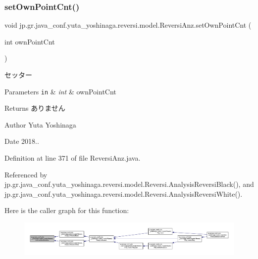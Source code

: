 \subsubsection{\texorpdfstring{set\+Own\+Point\+Cnt()}{setOwnPointCnt()}}
{\footnotesize\ttfamily void jp.\+gr.\+java\+\_\+conf.\+yuta\+\_\+yoshinaga.\+reversi.\+model.\+Reversi\+Anz.\+set\+Own\+Point\+Cnt (\begin{DoxyParamCaption}\item[{int}]{own\+Point\+Cnt }\end{DoxyParamCaption})}



セッター 


\begin{DoxyParams}[1]{Parameters}
\mbox{\tt in}  & {\em int} & own\+Point\+Cnt \\
\hline
\end{DoxyParams}
\begin{DoxyReturn}{Returns}
ありません 
\end{DoxyReturn}
\begin{DoxyAuthor}{Author}
Yuta Yoshinaga 
\end{DoxyAuthor}
\begin{DoxyDate}{Date}
2018.. 
\end{DoxyDate}


Definition at line 371 of file Reversi\+Anz.\+java.



Referenced by jp.\+gr.\+java\+\_\+conf.\+yuta\+\_\+yoshinaga.\+reversi.\+model.\+Reversi.\+Analysis\+Reversi\+Black(), and jp.\+gr.\+java\+\_\+conf.\+yuta\+\_\+yoshinaga.\+reversi.\+model.\+Reversi.\+Analysis\+Reversi\+White().

Here is the caller graph for this function\+:
\nopagebreak
\begin{figure}[H]
\begin{center}
\leavevmode
\includegraphics[width=350pt]{classjp_1_1gr_1_1java__conf_1_1yuta__yoshinaga_1_1reversi_1_1model_1_1_reversi_anz_a61316f0f4b113c2c86cd0a7e12f26dfe_icgraph}
\end{center}
\end{figure}
\mbox{\label{classjp_1_1gr_1_1java__conf_1_1yuta__yoshinaga_1_1reversi_1_1model_1_1_reversi_anz_ad57c26b0d7851a3c9e1b1ad328f2f0be}} 
